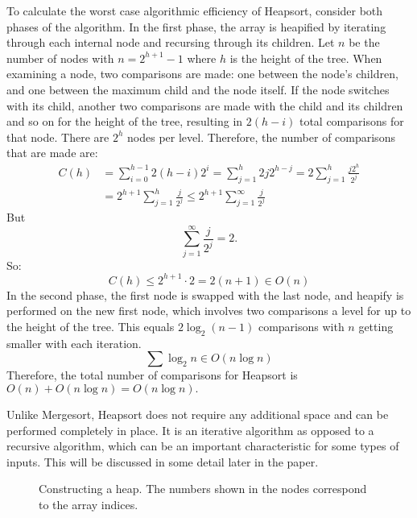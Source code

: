 \documentclass{article}
\begin{document}
To calculate the worst case algorithmic efficiency of Heapsort, consider both phases of the algorithm.
In the first phase, the array is heapified by iterating through each internal node and recursing
through its children. Let $n$ be the number of nodes with $n = 2^{h+1} - 1$ where $h$ is the height 
of the tree. When examining a node, two comparisons are made: 
one between the node's children, and one between the maximum child and the node itself. If the 
node switches with its child, another two comparisons are made with the child and its children and so 
on for the height of the tree, resulting in $2(h-i)$ total comparisons for that node. There are $2^h$ 
nodes per level. Therefore, the number of comparisons that are made are:
\begin{align*}
	C(h) &= \sum_{i=0}^{h-1} 2(h-i) 2^i = \sum_{j=1}^{h}2j 2^{h-j} = 2 \sum_{j=1}^h \frac{j2^h}{2^j}\\
	&= 2^{h+1} \sum_{j=1}^h \frac{j}{2^j} \le 2^{h+1}\sum_{j=1}^{\infty} \frac{j}{2^j}
\end{align*}
But 
\[
	\sum_{j=1}^{\infty} \frac{j}{2^j} = 2.
\]
So:
\[
	C(h) \le 2^{h+1} \cdot 2 = 2(n + 1) \in O(n)
\] 
In the second phase, the first node is swapped with the last node, and heapify is performed on
the new first node, which involves two comparisons a level for up to the height of the tree. 
This equals $2 \log_2(n-1)$ comparisons with $n$ getting smaller with each iteration. 
\[
	\sum \log_2 n \in O(n \log n)
\]
Therefore, the total number of comparisons for Heapsort is $O(n) + O(n\log n) = O(n\log n).$

Unlike Mergesort, Heapsort does not require any additional space and can be performed
completely in place. It is an iterative algorithm as opposed to a recursive algorithm, which
can be an important characteristic for some types of inputs. This will be discussed in some 
detail later in the paper.

\begin{figure}[heap]
	\begin{center}
	\caption{Constructing a heap. The numbers shown in the nodes correspond to the array indices.}
	\label{heap}\end{center}
\end{figure}
\end{document}

